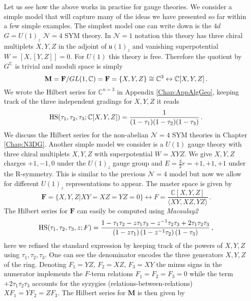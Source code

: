 \documentclass[main.tex]{subfiles}
\begin{document}
Let us see how the above works in practise for gauge theories.  We consider a simple model that will capture many of the ideas we have presented so far within a few simple examples.  
The simplest model one can write down is the $4d$ $G=U(1)_z$ $\mathcal{N}=4$ SYM theory.  In $\mathcal{N}=1$ notation this theory has three chiral multiplets $X,Y,Z$ in the adjoint of $\mathfrak{u}(1)_z$ and vanishing superpotential $W=[X,[Y,Z]]=0$.  For $U(1)$ this theory is free.  Therefore the quotient by $G^{\mathbb{C}}$ is trivial and moduli space is simply
\begin{equation}
\mathbf{M}=\mathbf{F}/GL(1,\mathbb{C})=\mathbf{F}=\{X,Y,Z\}\cong\mathbb{C}^3\leftrightarrow\mathbb{C}[X,Y,Z]\,.
\end{equation}
We wrote the Hilbert series for $\mathbb{C}^{n=3}$ in Appendix \ref{Chap:AppAlgGeo}, keeping track of the three independent gradings for $X,Y,Z$ it reads
\begin{equation}\label{eqn:hilbserFexample1}
\textrm{HS}(\tau_1,\tau_2,\tau_3;\mathbb{C}[X,Y,Z])=\frac{1}{(1-\tau_1)(1-\tau_2)(1-\tau_3)}\,.
\end{equation}
We discuss the Hilbert series for the non-abelian $\mathcal{N}=4$ SYM theories in Chapter \ref{Chap:N3DG}.  
Another simple model we consider is a $U(1)$ gauge theory with three chiral multiplets $X,Y,Z$ with superpotential $W=XYZ$.  We give $X,Y,Z$ charges $+1,-1,0$ under the $U(1)_z$ gauge group and $E=\frac{3}{2}r=+1,+1,+1$ under the R-symmetry.  This is similar to the previous $\mathcal{N}=4$ model but now we allow for different $U(1)_z$ representations to appear.
The master space is given by
\begin{equation}
\mathbf{F}=\{X,Y,Z|XY=XZ=YZ=0\}\leftrightarrow F=\frac{\mathbb{C}[X,Y,Z]}{\langle XY,XZ,YZ\rangle}\,.
\end{equation}
The Hilbert series for $\mathbf{F}$ can easily be computed using \textit{Macaulay2} \cite{M2}
\begin{equation}\label{eqn:hilbserFexample2}
\textrm{HS}(\tau_1,\tau_2,\tau_3,z;F)=\frac{1-\tau_1\tau_2-z\tau_1\tau_3-z^{-1}\tau_2\tau_3+2\tau_1\tau_2\tau_3}{\left(1-z\tau_1\right)\left(1-z^{-1}\tau_2\right)\left(1-\tau_3\right)}\,,
\end{equation}
here we refined the standard expression by keeping track of the powers of $X,Y,Z$ using $\tau_1,\tau_2,\tau_3$.  One can see the denominator encodes the three generators $X,Y,Z$ of the ring.  Denoting $F_1=YZ$, $F_2=XZ$, $F_3=XY$ the minus signs in the numerator implements the $F$-term relations $F_1=F_2=F_3=0$ while the term $+2\tau_1\tau_2\tau_3$ accounts for the syzygies (relations-between-relations) $XF_1=YF_2=ZF_3$.  The Hilbert series for $\mathbf{M}$ is then given by
\end{document}
